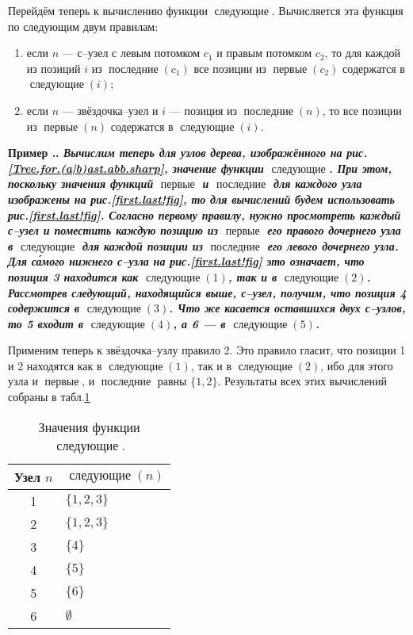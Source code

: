 \documentclass[10pt]{report}
\newcounter{exam}[section]
\renewcommand{\theexam}{\thesection.\arabic{exam}}
\newenvironment{Example}{\par\refstepcounter{exam}\bf Пример \theexam. \sl}{\rm\par}
\newcommand{\firstpos}{\mathop{\textit{первые}}}
\newcommand{\lastpos}{\mathop{\textit{последние}}}
\newcommand{\followpos}{\mathop{\textit{следующие}}}
\begin{document}
Перейдём теперь к вычислению функции $\followpos$. Вычисляется эта функция по следующим двум правилам:
\begin{enumerate}
    \item если $n$ --- с--узел с левым потомком $c_1$ и правым потомком $c_2$, то для каждой из позиций $i$ из $\lastpos(c_1)$ все позиции из $\firstpos(c_2)$ содержатся в
$\followpos(i)$;
    \item если $n$ --- звёздочка--узел и $i$ --- позиция из $\lastpos(n)$, то все позиции из $\firstpos(n)$ содержатся в $\followpos(i)$.
\end{enumerate}

\begin{Example} Вычислим теперь для узлов дерева, изображённого на рис.\ref{Tree.for.(a|b)ast.abb.sharp}, значение функции $\followpos$. При этом, поскольку значения функций
$\firstpos$ и $\lastpos$ для каждого узла изображены на рис.\ref{first.last!fig}, то для вычислений будем использовать рис.\ref{first.last!fig}. Согласно первому правилу, нужно просмотреть
каждый с--узел и поместить каждую позицию из $\firstpos$ его правого дочернего узла в $\followpos$ для каждой позиции из $\lastpos$ его левого дочернего узла. Для с\'{а}мого нижнего
с--узла на рис.\ref{first.last!fig} это означает, что позиция 3 находится как $\followpos(1)$, так и в $\followpos(2)$. Рассмотрев следующий, находящийся выше, с--узел, получим, что
позиция 4 содержится в $\followpos(3)$. Что же касается оставшихся двух с--узлов, то 5 входит в $\followpos(4)$, а 6 --- в $\followpos(5)$.

Применим теперь к звёздочка--узлу правило 2. Это правило гласит, что позиции 1 и 2 находятся как в $\followpos(1)$, так и в $\followpos(2)$, ибо для этого узла и $\firstpos$, и
$\lastpos$ равны $\{1,2\}$. Результаты всех этих вычислений собраны в табл.\ref{followpos!table}
\begin{table}[!h]
  \centering
  \caption{Значения функции $\followpos$.}\label{followpos!table}
  \vspace{1mm}
\begin{tabular}{|c|l|}  \hline
Узел $n$    & $\followpos(n)$   \\  \hline
1           & $\{1,2,3\}$       \\  \hline
2           & $\{1,2,3\}$       \\  \hline
3           & $\{4\}$           \\  \hline
4           & $\{5\}$           \\  \hline
5           & $\{6\}$           \\  \hline
6           & $\emptyset$       \\  \hline
\end{tabular}
\end{table}
\end{Example}
\end{document}

